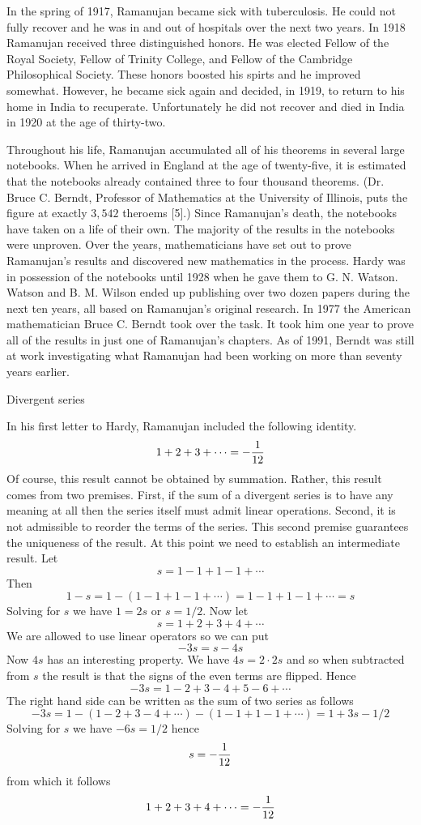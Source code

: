 In the spring of 1917, Ramanujan became sick with tuberculosis.
He could not fully recover and he was in and out of hospitals over the next two years.
In 1918 Ramanujan received three distinguished honors.
He was elected Fellow of the Royal Society, Fellow of Trinity College, and Fellow of the
Cambridge Philosophical Society.
These honors boosted his spirts and he improved somewhat.
However, he became sick again and decided, in 1919, to return to his
home in India to recuperate.
Unfortunately he did not recover and died in India in 1920 at the age of thirty-two.

Throughout his life, Ramanujan accumulated all of his theorems in several large
notebooks.
When he arrived in England at the age of twenty-five, it is estimated that the notebooks
already contained three to four thousand theorems.
(Dr. Bruce C. Berndt, Professor of Mathematics at the University of Illinois,
puts the figure at exactly $3,542$ theroems [5].)
Since Ramanujan's death, the notebooks have taken on a life of their own.
The majority of the results in the notebooks were unproven.
Over the years, mathematicians have set out to prove Ramanujan's results and
discovered new mathematics in the process.
Hardy was in possession of the notebooks until 1928 when he gave them to G. N. Watson.
Watson and B. M. Wilson ended up publishing over
two dozen papers during the next ten years, all based on Ramanujan's original
research.
In 1977 the American mathematician Bruce C. Berndt took over the task.
It took him one year to prove all of the results in just one of Ramanujan's chapters.
As of 1991, Berndt was still at work investigating what Ramanujan had been working
on more than seventy years earlier.



 Divergent series

In his first letter to Hardy, Ramanujan included the following identity.
$$1+2+3+\cdots=-{1\over12}$$
Of course, this result cannot be obtained by summation.
Rather, this result comes from two premises.
First, if the sum of a divergent series is to have any meaning at all then the series
itself must admit linear operations.
Second, it is not admissible to reorder the terms of the series.
This second premise guarantees the uniqueness of the result.
At this point we need to establish an intermediate result. Let
$$s=1-1+1-1+\cdots$$
Then
$$1-s=1-(1-1+1-1+\cdots)=1-1+1-1+\cdots=s$$
Solving for $s$ we have $1=2s$ or $s=1/2$.
Now let
$$s=1+2+3+4+\cdots$$
We are allowed to use linear operators so we can put
$$-3s=s-4s$$
Now $4s$ has an interesting property. We have $4s=2\cdot2s$ and so when subtracted
from $s$ the result is that the signs of the even terms are flipped. Hence
$$-3s=1-2+3-4+5-6+\cdots$$
The right hand side can be written as the sum of two series as follows
$$-3s=1-(1-2+3-4+\cdots)-(1-1+1-1+\cdots)=1+3s-1/2$$
Solving for $s$ we have $-6s=1/2$ hence
$$s=-{1\over12}$$
from which it follows
$$1+2+3+4+\cdots=-{1\over12}$$


